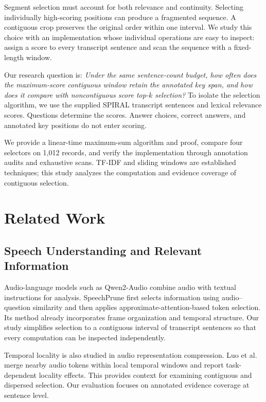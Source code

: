 \documentclass[10pt,journal,compsoc]{IEEEtran}
\begin{document}
Segment selection must account for both relevance and continuity. Selecting individually high-scoring positions can produce a fragmented sequence. A contiguous crop preserves the original order within one interval. We study this choice with an implementation whose individual operations are easy to inspect: assign a score to every transcript sentence and scan the sequence with a fixed-length window.

Our research question is: \emph{Under the same sentence-count budget, how often does the maximum-score contiguous window retain the annotated key span, and how does it compare with noncontiguous score top-$k$ selection?} To isolate the selection algorithm, we use the supplied SPIRAL transcript sentences and lexical relevance scores. Questions determine the scores. Answer choices, correct answers, and annotated key positions do not enter scoring.

We provide a linear-time maximum-sum algorithm and proof, compare four selectors on 1,012 records, and verify the implementation through annotation audits and exhaustive scans. TF-IDF and sliding windows are established techniques; this study analyzes the computation and evidence coverage of contiguous selection.

\section{Related Work}
\subsection{Speech Understanding and Relevant Information}
Audio-language models such as Qwen2-Audio combine audio with textual instructions for analysis\cite{chu2024qwen}. SpeechPrune first selects information using audio--question similarity and then applies approximate-attention-based token selection\cite{lin2025speechprune}. Its method already incorporates frame organization and temporal structure. Our study simplifies selection to a contiguous interval of transcript sentences so that every computation can be inspected independently.

Temporal locality is also studied in audio representation compression. Luo et al. merge nearby audio tokens within local temporal windows and report task-dependent locality effects\cite{luo2026locality}. This provides context for examining contiguous and dispersed selection. Our evaluation focuses on annotated evidence coverage at sentence level.
\end{document}
